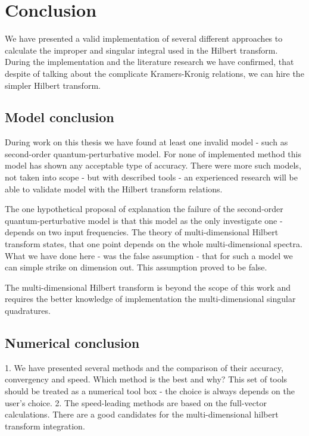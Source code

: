 \documentclass[12pt,twoside,a4paper]{article}
\numberwithin{equation}{subsection}
\numberwithin{figure}{subsection}
\begin{document}
\section{Conclusion} \label{chap:conclusion}

We have presented a valid implementation of several different approaches to calculate the improper and singular integral used in
the Hilbert transform. During the implementation and the literature research we have confirmed, that despite of talking about the
complicate Kramers-Kronig relations, we can hire the simpler Hilbert transform.

\subsection{Model conclusion} \label{chap:conclusion_model}


During work on this thesis we have found at least one invalid model - such as second-order quantum-perturbative model. For none of
implemented method this model has shown any acceptable type of accuracy. There were more such models, not taken into scope - but
with described tools - an experienced research will be able to validate model with the Hilbert transform relations.

The one hypothetical proposal of explanation the failure of the second-order quantum-perturbative model is that this model as the
only investigate one - depends on two input frequencies. The theory of multi-dimensional Hilbert transform states, that one point
depends on the whole multi-dimensional spectra. What we have done here - was the false assumption - that for such a model we can
simple strike on dimension out. This assumption proved to be false. 

The multi-dimensional Hilbert transform is beyond the scope of this work and requires the better knowledge of implementation the
multi-dimensional singular quadratures.


\subsection{Numerical conclusion} \label{chap:conclusion_numerical}


1. We have presented several methods and the comparison of their accuracy, convergency and speed. Which method is the best and why?
This set of tools should be treated as a numerical tool box - the choice is always depends on the user's choice.
2. The speed-leading methods are based on the full-vector calculations. There are a good candidates for the multi-dimensional
hilbert transform integration.
\end{document}
